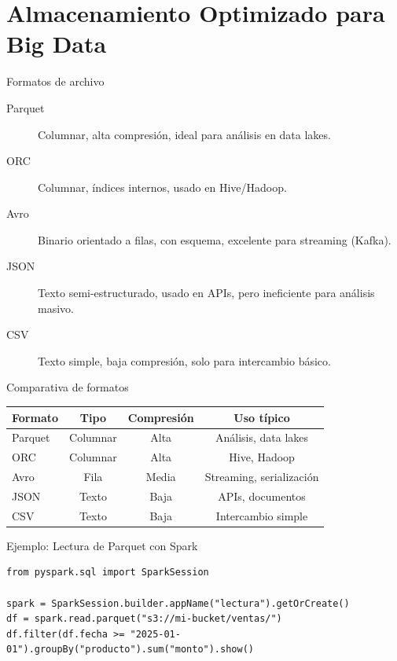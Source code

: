 \documentclass[aspectratio=169, 10pt, xcolor=table]{beamer}
\begin{document}
\section{Almacenamiento Optimizado para Big Data}

\begin{frame}{Formatos de archivo}
    \begin{description}
        \item[Parquet] Columnar, alta compresión, ideal para análisis en data lakes.
        \item[ORC] Columnar, índices internos, usado en Hive/Hadoop.
        \item[Avro] Binario orientado a filas, con esquema, excelente para streaming (Kafka).
        \item[JSON] Texto semi-estructurado, usado en APIs, pero ineficiente para análisis masivo.
        \item[CSV] Texto simple, baja compresión, solo para intercambio básico.
    \end{description}
\end{frame}

\begin{frame}{Comparativa de formatos}
    \begin{table}
        \centering
        \begin{tabular}{l|c|c|c}
            \toprule
            Formato & Tipo & Compresión & Uso típico \\
            \midrule
            Parquet & Columnar & Alta & Análisis, data lakes \\
            ORC & Columnar & Alta & Hive, Hadoop \\
            Avro & Fila & Media & Streaming, serialización \\
            JSON & Texto & Baja & APIs, documentos \\
            CSV & Texto & Baja & Intercambio simple \\
            \bottomrule
        \end{tabular}
    \end{table}
\end{frame}

\begin{frame}[fragile]{Ejemplo: Lectura de Parquet con Spark}
    \begin{lstlisting}[style=python]
from pyspark.sql import SparkSession

spark = SparkSession.builder.appName("lectura").getOrCreate()
df = spark.read.parquet("s3://mi-bucket/ventas/")
df.filter(df.fecha >= "2025-01-01").groupBy("producto").sum("monto").show()
    \end{lstlisting}
\end{frame}
\end{document}
